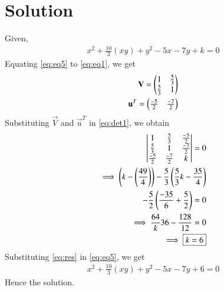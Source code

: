 \documentclass[journal,12pt,twocolumn]{IEEEtran}
\begin{document}
\section{Solution}
Given,
\begin{align}
x^{2}+ \frac{10}{3}(xy)+y^2 -5x -7y + k =0 \label{eq:eq5}
\end{align}
Equating  \eqref{eq:eq5} to \eqref{eq:eq1}, we get
\begin{align}
	\mathbf{V} = \begin{pmatrix}1& \frac{5}{3} \\ \frac{5}{3} & 1\end{pmatrix}\label{myeq}\\
	\mathbf{u}^T = \begin{pmatrix}\frac{-5}{2} & \frac{-7}{2}\end{pmatrix}\label{df}
\end{align}
Substituting $\vec{V}$ and $\vec{u}^T$ in \eqref{eq:det1}, we obtain
\begin{align}\label{dett}
\begin{vmatrix}1& \frac{5}{3} & \frac{-5}{2} \\ \frac{5}{3} & 1 & \frac{-7}{2} \\ \frac{-5}{2} & \frac{-7}{2} & k\end{vmatrix} = 0 \\
\implies \left(k - \left(\frac{49}{4}\right)\right)-\frac{5}{3}\left(\frac{5}{3}k - \frac{35}{4}\right) \nonumber\\
-
\frac{5}{2} \left(\frac{-35}{6}+\frac{5}{2}\right) = 0\\
\implies \frac{64}k{36} - \frac{128}{12} = 0\\
\implies \boxed{k = 6} \label{eq:res}
\end{align}
Substituting \eqref{eq:res} in \eqref{eq:eq5}, we get
\begin{align}
	x^{2}+ \frac{10}{3}(xy)+y^2 -5x -7y + 6 =0  \label{eq:reseq}
\end{align}
Hence the solution.
\end{document}
